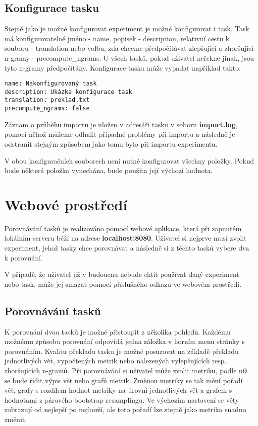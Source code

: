 \subsection{Konfigurace tasku}
Stejně jako je možné konfigurovat experiment je možné konfigurovat i task.
Task má konfigurovatelné jméno - name, popisek - description,
  relativní cestu k souboru - translation nebo volbu,
  zda chceme předpočítávat zlepšující a zhoršující n-gramy - precompute\_ngrams.
U všech tasků, pokud uživatel neřekne jinak, 
  jsou tyto n-gramy předpočítány.
Konfigurace tasku může vypadat například takto:

\begin{verbatim}
name: Nakonfigurovaný task
description: Ukázka konfigurace task
translation: preklad.txt
precompute_ngrams: false
\end{verbatim}

Záznam o průběhu importu je uložen v adresáři tasku v soboru \textbf{import.log},
  pomocí něhož můžeme odhalit případné problémy při importu
  a následně je odstranit stejným způsobem jako tomu bylo při importu experimentu.

V obou konfiguračních souborech není nutné konfigurovat všechny položky.
Pokud bude některá položka vynechána,
  bude použita její výchozí hodnota. 

\section{Webové prostředí}
Porovnávání tasků je realizováno pomocí webové aplikace,
  která při zapnutém lokálním serveru běží na adrese \textbf{localhost:8080}.
Uživatel si nejprve musí zvolit experiment,
  jehož tasky chce porovnávat a následně si z těchto tasků vybere dva k porovnání.

V případě,
  že uživatel již v budoucnu nebude chtít používat daný experiment nebo task,
  může jej smazat pomocí příslušného odkazu ve webovém prostředí.

\subsection{Porovnávání tasků}
K porovnání dvou tasků je možné přistoupit z několika pohledů.
Každému možnému způsobu porovnání odpovídá jedna záložka v horním menu stránky s porovnáním.
Kvalitu překladu tasku je možné posuzovat na základě překladu jednotlivých vět,
  vypočtených metrik nebo nalezených vylepšujících resp. zhoršujících n-gramů.
Při porovnávání si uživatel může zvolit metriku,
  podle níž se bude řídit výpis vět nebo grafů metrik.
Změnou metriky se tak mění pořadí vět,
  grafy s rozdílem hodnot metriky na úrovni jednotlivých vět
  a grafem s hodnotami z párového bootstrap resamplingu.
Ve výchozím nastavení se věty zobrazují od nejlepší po nejhorší,
  ale toto pořadí lze stejně jako metrika snadno změnit.

